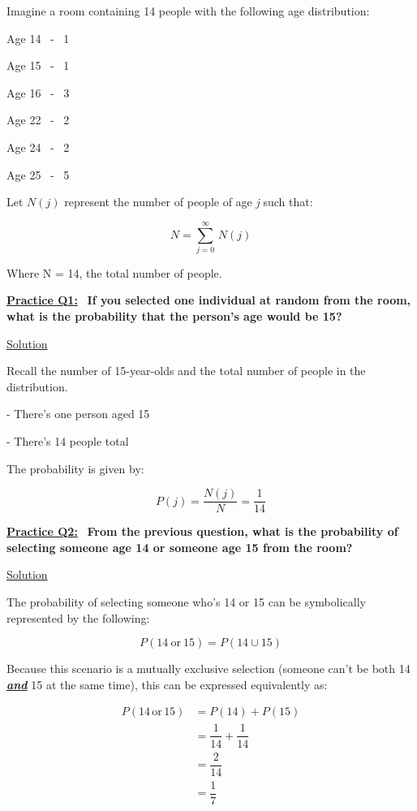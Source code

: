 Imagine a room containing 14 people with the following age distribution:

Age 14 \ - \ 1

Age 15 \ - \ 1

Age 16 \ - \ 3

Age 22 \ - \ 2

Age 24 \ - \ 2

Age 25 \ - \ 5

\bigskip

Let $N(j)$ represent the number of people of age \textit{j} such that:

\[
    N = \sum_{j=0}^{\infty} \, N(j)
\]

Where N = 14, the total number of people. 

\bigskip \bigskip

\underline{\textbf{Practice Q1:}} \ \textbf{If you selected one individual at random from the room,
what is the probability that the person's age would be 15?}

\bigskip

\underline{Solution}

Recall the number of 15-year-olds and the total number of people in the distribution.

- There's one person aged 15

- There's 14 people total

\bigskip

The probability is given by:

\[
    P(j) = \dfrac{N(j)}{N} = \boxed{\dfrac{1}{14}}
\]

\bigskip \bigskip

\underline{\textbf{Practice Q2:}} \ \textbf{From the previous question, what is the probability of selecting someone
age 14 or someone age 15 from the room?}

\bigskip

\underline{Solution}

The probability of selecting someone who's 14 or 15 can be symbolically represented by the following:

\[
    P(14 \ \text{or} \ 15) = P(14 \cup 15)
\]

\newpage

Because this scenario is a mutually exclusive selection (someone can't be both
14 \textit{\textbf{\underline{and}}} 15 at the same time), this can be expressed
equivalently as:

\begin{align*}
    P(14 \, \text{or} \, 15) &= P(14) + P(15) \\[1.5ex]
    &= \dfrac{1}{14} + \dfrac{1}{14} \\[1.5ex]
    &= \dfrac{2}{14} \\[1.5ex]
    &= \boxed{\dfrac{1}{7}}
\end{align*}

